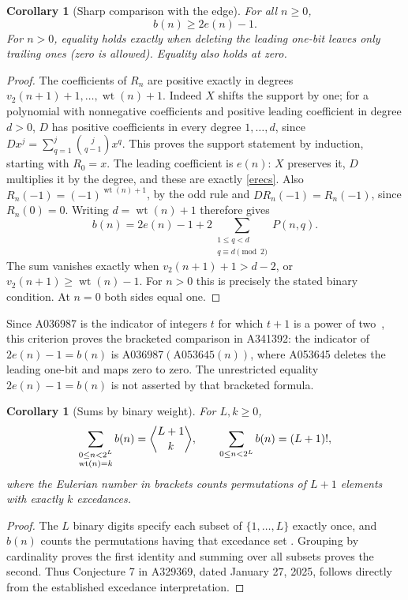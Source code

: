\documentclass[11pt]{article}
\newcommand{\wt}{\operatorname{wt}}
\newtheorem{corollary}[theorem]{Corollary}
\begin{document}
\begin{corollary}[Sharp comparison with the edge]\label{sharp}
For all $n\geq0$,
\[
 b(n)\geq2e(n)-1.
\]
For $n>0$, equality holds exactly when deleting the leading one-bit
leaves only trailing ones (zero is allowed). Equality also holds at zero.
\end{corollary}
\begin{proof}
The coefficients of $R_n$ are positive exactly in degrees
$v_2(n+1)+1,\ldots,\wt(n)+1$. Indeed $X$ shifts the support by one;
for a polynomial with nonnegative coefficients and positive leading
coefficient in degree $d>0$, $D$ has positive coefficients in every
degree $1,\ldots,d$, since
$Dx^j=\sum_{q=1}^j\binom j{q-1}x^q$.
This proves the support statement by induction, starting with $R_0=x$.
The leading coefficient is $e(n)$: $X$ preserves it, $D$ multiplies it
by the degree, and these are exactly \eqref{erecs}.
Also $R_n(-1)=(-1)^{\wt(n)+1}$, by the odd rule and
$DR_n(-1)=R_n(-1)$, since $R_n(0)=0$.
Writing $d=\wt(n)+1$ therefore gives
\[
 b(n)=2e(n)-1+
 2\sum_{\substack{1\leq q<d\\q\equiv d\pmod2}}P(n,q).
\]
The sum vanishes exactly when $v_2(n+1)+1>d-2$, or
$v_2(n+1)\geq\wt(n)-1$. For $n>0$ this is precisely the stated
binary condition. At $n=0$ both sides equal one.
\end{proof}
Since A036987 is the indicator of integers $t$ for which $t+1$ is a
power of two~\cite{indicator}, this criterion proves the bracketed
comparison in A341392: the indicator of $2e(n)-1=b(n)$ is
A036987$(\mathrm{A053645}(n))$, where A053645 deletes the leading
one-bit and maps zero to zero. The unrestricted equality
$2e(n)-1=b(n)$ is not asserted by that bracketed formula.

\begin{corollary}[Sums by binary weight]\label{eulerian}
For $L,k\geq0$,
\[
 \sum_{\substack{0\leq n<2^L\\\wt(n)=k}}b(n)
 =\genfrac{\langle}{\rangle}{0pt}{}{L+1}{k},
 \qquad \sum_{0\leq n<2^L}b(n)=(L+1)!,
\]
where the Eulerian number in brackets counts permutations of $L+1$
elements with exactly $k$ excedances.
\end{corollary}
\begin{proof}
The $L$ binary digits specify each subset of $\{1,\ldots,L\}$ exactly
once, and $b(n)$ counts the permutations having that excedance set
\cite{excedance,excentry}. Grouping by cardinality proves the first
identity and summing over all subsets proves the second. Thus
Conjecture 7 in A329369, dated January 27, 2025, follows directly from
the established excedance interpretation.
\end{proof}
\end{document}

